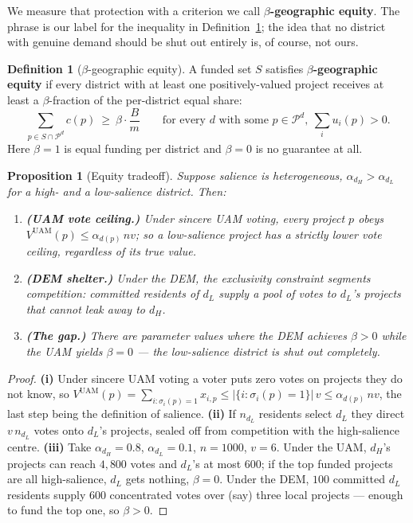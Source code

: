 \documentclass[11pt,letterpaper]{article}
\theoremstyle{definition}
\newtheorem{definition}{Definition}[section]
\theoremstyle{plain}
\newtheorem{proposition}{Proposition}[section]
\theoremstyle{remark}
\newcommand{\Pset}{\mathcal{P}}
\newcommand{\votes}{v}
\newcommand{\budget}{B}
\newcommand{\cost}{c}
\newcommand{\UAM}{\text{UAM}}
\newcommand{\salience}{\alpha}
\begin{document}
\begin{naming}
We measure that protection with a criterion we call \textbf{$\beta$-geographic equity}. The phrase
is our label for the inequality in Definition~\ref{def:geo}; the idea that no district with genuine
demand should be shut out entirely is, of course, not ours.
\end{naming}

\begin{definition}[$\beta$-geographic equity]
\label{def:geo}
A funded set $S$ satisfies \textbf{$\beta$-geographic equity} if every district with at least one
positively-valued project receives at least a $\beta$-fraction of the per-district equal share:
\[
  \sum_{p\in S\cap\Pset^d}\cost(p)\ \ge\ \beta\cdot\frac{\budget}{m}
  \qquad\text{for every } d \text{ with some } p\in\Pset^d,\ \textstyle\sum_i u_i(p)>0 .
\]
Here $\beta=1$ is equal funding per district and $\beta=0$ is no guarantee at all.
\end{definition}

\begin{proposition}[Equity tradeoff]
\label{prop:equity}
Suppose salience is heterogeneous, $\salience_{d_H}>\salience_{d_L}$ for a high- and a low-salience
district. Then:
\begin{enumerate}[label=\textup{(\roman*)},nosep]
  \item \textbf{(UAM vote ceiling.)} Under sincere UAM voting, every project $p$ obeys
        $V^{\UAM}(p)\le\salience_{d(p)}\,n\votes$; so a low-salience project has a strictly lower
        vote \emph{ceiling}, regardless of its true value.
  \item \textbf{(DEM shelter.)} Under the DEM, the exclusivity constraint segments competition:
        committed residents of $d_L$ supply a pool of votes to $d_L$'s projects that cannot leak
        away to $d_H$.
  \item \textbf{(The gap.)} There are parameter values where the DEM achieves $\beta>0$ while the
        UAM yields $\beta=0$ --- the low-salience district is shut out completely.
\end{enumerate}
\end{proposition}

\begin{proof}
\textbf{(i)} Under sincere UAM voting a voter puts zero votes on projects they do not know, so
$V^{\UAM}(p)=\sum_{i:\sigma_i(p)=1}x_{i,p}\le|\{i:\sigma_i(p)=1\}|\,\votes\le\salience_{d(p)}\,n\votes$,
the last step being the definition of salience.
\textbf{(ii)} If $n_{d_L}$ residents select $d_L$ they direct $\votes\,n_{d_L}$ votes onto $d_L$'s
projects, sealed off from competition with the high-salience centre.
\textbf{(iii)} Take $\salience_{d_H}=0.8$, $\salience_{d_L}=0.1$, $n=1000$, $\votes=6$. Under the
UAM, $d_H$'s projects can reach $4{,}800$ votes and $d_L$'s at most $600$; if the top funded
projects are all high-salience, $d_L$ gets nothing, $\beta=0$. Under the DEM, $100$ committed $d_L$
residents supply $600$ concentrated votes over (say) three local projects --- enough to fund the top
one, so $\beta>0$.
\end{proof}
\end{document}
